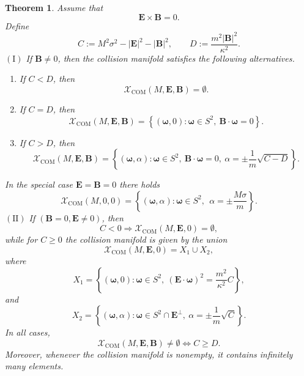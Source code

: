 \documentclass[10pt,a4paper]{amsart}
\newtheorem{theorem}{Theorem}[section]
\begin{document}
\begin{theorem}\label{exceptionalcase}
Assume that
\[
{\bm E}\times{\bm B}=0.
\]
Define
\begin{equation}\label{CD}
C:=M^2\sigma^2-|{\bm E}|^2-|{\bm B}|^2,
\qquad
D:=\frac{m^2|{\bm B}|^2}{\kappa^2}.
\end{equation}
$\mathrm{(I)}$ If ${\bm B}\neq0$, then the collision manifold satisfies the following alternatives.
\begin{enumerate}
\item If $C<D$, then
\[
\mathcal X_{\mathrm{COM}}(M,{\bm E},{\bm B})=\emptyset.
\]
\item If $C=D$, then
\[
\mathcal X_{\mathrm{COM}}(M,{\bm E},{\bm B})
=
\left\{
({\bm\omega},0)
:
{\bm\omega}\in S^2,\ 
{\bm B}\cdot{\bm\omega}=0
\right\}.
\]
\item If $C>D$, then
\[
\mathcal X_{\mathrm{COM}}(M,{\bm E},{\bm B})
=
\left\{
({\bm\omega},\alpha)
:
{\bm\omega}\in S^2,\ 
{\bm B}\cdot{\bm\omega}=0,\ 
\alpha=\pm\frac1m\sqrt{C-D}
\right\}.
\]
\end{enumerate}
In the special case ${\bm E}={\bm B}=0$ there holds
\[
\mathcal X_{\mathrm{COM}}(M,0,0)=\left\{
({\bm\omega},\alpha)
:
{\bm\omega}\in S^2,\ \ 
\alpha=\pm\frac{M\sigma}{m}
\right\}.
\]
$\mathrm{(II)}$ If $({\bm B}=0,{\bm E}\neq0)$,
then 
\[
C<0\Rightarrow \mathcal X_{\mathrm{COM}}(M,{\bm E},0)=\emptyset,
\]
while for $C\geq 0$ the collision manifold is given by the union
\[
\mathcal X_{\mathrm{COM}}(M,{\bm E},0)=X_1\cup X_2,
\]
where
\[
X_1=
\left\{
({\bm\omega},0):
{\bm\omega}\in S^2,\ 
({\bm E}\cdot{\bm\omega})^2
=\frac{m^2}{\kappa^2}C
\right\},
\]
and
\[
X_2=
\left\{
({\bm\omega},\alpha):
{\bm\omega}\in S^2\cap{\bm E}^{\perp},\ 
\alpha=\pm\frac1m\sqrt{C}
\right\}.
\]
In all cases,
\[
\mathcal X_{\mathrm{COM}}(M,{\bm E},{\bm B})\neq\emptyset
\iff
C\ge D.
\]
Moreover, whenever the collision manifold is nonempty, it contains infinitely many elements.
\end{theorem}
\end{document}

